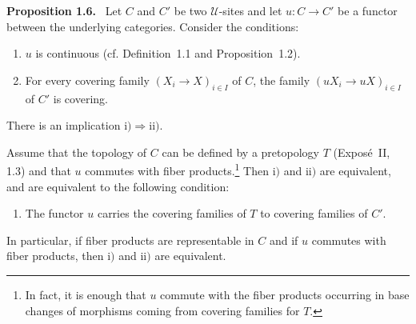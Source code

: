 \documentclass[11pt]{article}
\newcommand{\U}{\mathcal{U}}
\newenvironment{statement}[1]{\par\medskip\noindent\textbf{#1.}\ }{\par\medskip}
\begin{document}
\begin{statement}{Proposition 1.6}
Let \(C\) and \(C'\) be two \(\U\)-sites and let \(u:C\to C'\) be a functor between the underlying categories. Consider the conditions:
\begin{enumerate}[label=\roman*)]
\item \(u\) is continuous (cf. Definition~1.1 and Proposition~1.2).
\item For every covering family \((X_i\to X)_{i\in I}\) of \(C\), the family \((uX_i\to uX)_{i\in I}\) of \(C'\) is covering.
\end{enumerate}
There is an implication \(\mathrm{i)}\Rightarrow\mathrm{ii)}\).

Assume that the topology of \(C\) can be defined by a pretopology \(T\) (Expos\'e~II, 1.3) and that \(u\) commutes with fiber products.\footnote{In fact, it is enough that \(u\) commute with the fiber products occurring in base changes of morphisms coming from covering families for \(T\).} Then \(\mathrm{i)}\) and \(\mathrm{ii)}\) are equivalent, and are equivalent to the following condition:
\begin{enumerate}[label=\roman*),start=3]
\item The functor \(u\) carries the covering families of \(T\) to covering families of \(C'\).
\end{enumerate}
In particular, if fiber products are representable in \(C\) and if \(u\) commutes with fiber products, then \(\mathrm{i)}\) and \(\mathrm{ii)}\) are equivalent.
\end{statement}
\end{document}
